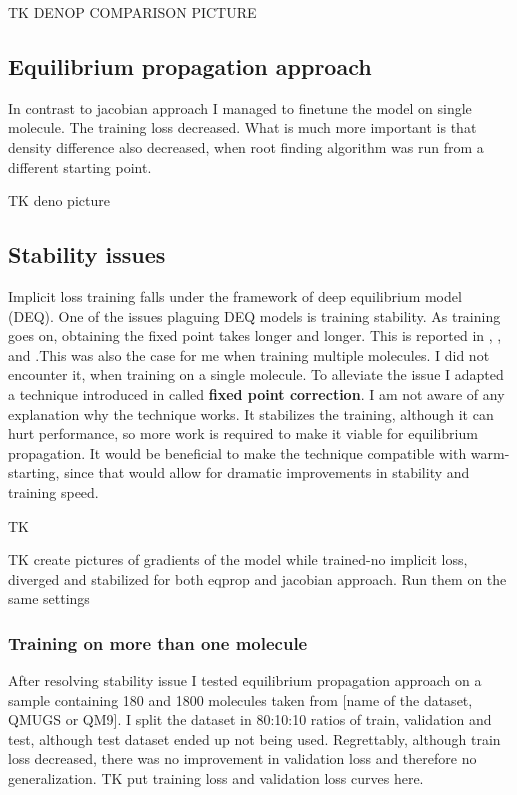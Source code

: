 \documentclass[a4paper,10pt]{report}
\begin{document}
 TK DENOP COMPARISON PICTURE

\subsection{Equilibrium propagation approach}
In contrast to jacobian approach I managed to finetune the model on single molecule.
The training loss decreased. What is much more important is that density difference also decreased, when root finding algorithm was run from a different starting point.




TK deno picture
\subsection{Stability issues}
Implicit loss training falls under the framework of deep equilibrium model (DEQ). One of the issues plaguing DEQ models is training stability. As training goes on, obtaining the fixed point takes longer and longer.  This is reported in \cite{opticalflow}, \cite{bai2021stabilizing}, \cite{burger2025dequify} and \cite{geng2023torchdeq}.This was also the case for me when training multiple molecules. I did not encounter it, when training on a single molecule. To alleviate the issue I adapted a technique introduced in \cite{opticalflow} called \textbf{fixed point correction}. I am not aware of any explanation why the technique works. It stabilizes the training, although it can hurt performance, so more work is required to make it viable for equilibrium propagation.
It would be beneficial to make the technique compatible with warm-starting, since that would allow for dramatic improvements in stability and training speed.


TK

TK create pictures of gradients of the model while trained-no implicit loss, diverged and stabilized for both eqprop and jacobian approach.
Run them on the same settings
\subsubsection{Training on more than one molecule}
After resolving stability issue I tested equilibrium propagation approach on a sample containing 180 and 1800 molecules taken from [name of the dataset, QMUGS or QM9]. I split the dataset in 80:10:10 ratios of train, validation and test, although test dataset ended up not being used. Regrettably, although train loss decreased, there was no improvement in validation loss and therefore no generalization.
TK put training loss and validation loss curves here.
\end{document}
